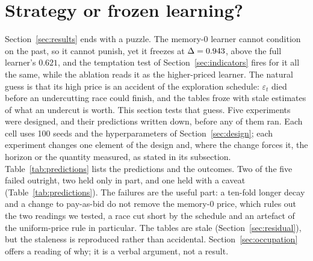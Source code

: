\section{Strategy or frozen learning?}\label{sec:phase1}

Section~\ref{sec:results} ends with a puzzle. The memory-0 learner cannot condition on the past, so it cannot punish, yet it freezes at $\Delta = 0.943$, above the full learner's $0.621$, and the temptation test of Section~\ref{sec:indicators} fires for it all the same, while the ablation reads it as the higher-priced learner. The natural guess is that its high price is an accident of the exploration schedule: $\varepsilon_t$ died before an undercutting race could finish, and the tables froze with stale estimates of what an undercut is worth. This section tests that guess. Five experiments were designed, and their predictions written down, before any of them ran. Each cell uses 100 seeds and the hyperparameters of Section~\ref{sec:design}; each experiment changes one element of the design and, where the change forces it, the horizon or the quantity measured, as stated in its subsection. Table~\ref{tab:predictions} lists the predictions and the outcomes. Two of the five failed outright, two held only in part, and one held with a caveat (Table~\ref{tab:predictions}). The failures are the useful part: a ten-fold longer decay and a change to pay-as-bid do not remove the memory-0 price, which rules out the two readings we tested, a race cut short by the schedule and an artefact of the uniform-price rule in particular. The tables are stale (Section~\ref{sec:residual}), but the staleness is reproduced rather than accidental. Section~\ref{sec:occupation} offers a reading of why; it is a verbal argument, not a result.

